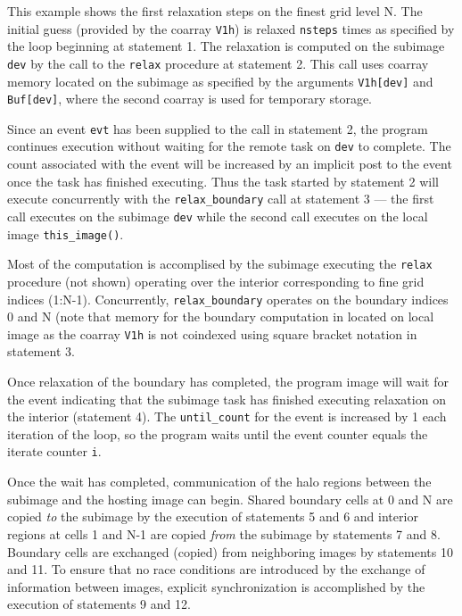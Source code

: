 This example shows the first relaxation steps on the finest grid level N.  The initial
guess (provided by the coarray \texttt{V1h}) is relaxed \texttt{nsteps} times as
specified by the loop beginning at statement 1.  The relaxation is computed on
the subimage \texttt{dev} by the call to the \texttt{relax} procedure at statement 2.
This call uses coarray memory located on the subimage as specified by the arguments
\texttt{V1h[dev]} and \texttt{Buf[dev]}, where the second coarray is used for temporary
storage.

Since an event \texttt{evt} has been supplied to the call in statement 2, the program
continues execution without waiting for the remote task on \texttt{dev} to complete.  The
count associated with the event will be increased by an implicit post to the event once
the task has finished executing.  Thus the task started by statement 2 will execute
concurrently with the \texttt{relax\_boundary} call at statement 3 --- the first call
executes on the subimage \texttt{dev} while the second call executes on the local image
\texttt{this\_image()}.

Most of the computation is accomplised by the subimage executing the \texttt{relax}
procedure (not shown) operating over the interior corresponding to fine grid indices (1:N-1).
Concurrently, \texttt{relax\_boundary} operates on the boundary indices 0 and N
(note that memory for the boundary computation in located on local image as
the coarray \texttt{V1h} is not coindexed using square bracket notation in statement 3.

Once relaxation of the boundary has completed, the program image will wait for the event
indicating that the subimage task has finished executing relaxation on the interior (statement
4).  The \texttt{until\_count} for the event is increased by 1 each iteration of the loop,
so the program waits until the event counter equals the iterate counter \texttt{i}.

Once the wait has completed, communication of the halo regions between the subimage and
the hosting image can begin.  Shared boundary cells at 0 and N are copied \emph{to} the
subimage by the execution of statements 5 and 6 and interior regions at cells 1 and N-1 are
copied \emph{from} the subimage by statements 7 and 8.  Boundary cells are exchanged (copied)
from neighboring images by statements 10 and 11.  To ensure that no race conditions are
introduced by the exchange of information between images, explicit synchronization is
accomplished by the execution of statements 9 and 12.

